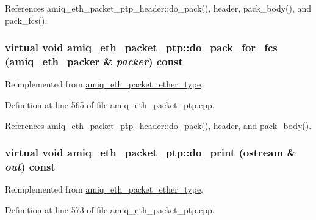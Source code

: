 References amiq\_\-eth\_\-packet\_\-ptp\_\-header::do\_\-pack(), header, pack\_\-body(), and pack\_\-fcs().\hypertarget{classamiq__eth__packet__ptp_a68337ad7c7971f267b692dfbd92ede7b}{
\subsubsection[{do\_\-pack\_\-for\_\-fcs}]{\setlength{\rightskip}{0pt plus 5cm}virtual void amiq\_\-eth\_\-packet\_\-ptp::do\_\-pack\_\-for\_\-fcs ({\bf amiq\_\-eth\_\-packer} \& {\em packer}) const}}
\label{classamiq__eth__packet__ptp_a68337ad7c7971f267b692dfbd92ede7b}


Reimplemented from \hyperlink{classamiq__eth__packet__ether__type_aaa85cf778650e1c1b377392a975cb7bc}{amiq\_\-eth\_\-packet\_\-ether\_\-type}.

Definition at line 565 of file amiq\_\-eth\_\-packet\_\-ptp.cpp.

References amiq\_\-eth\_\-packet\_\-ptp\_\-header::do\_\-pack(), header, and pack\_\-body().\hypertarget{classamiq__eth__packet__ptp_a52db9ab62ab743317a7ca4745a823a82}{
\subsubsection[{do\_\-print}]{\setlength{\rightskip}{0pt plus 5cm}virtual void amiq\_\-eth\_\-packet\_\-ptp::do\_\-print (ostream \& {\em out}) const}}
\label{classamiq__eth__packet__ptp_a52db9ab62ab743317a7ca4745a823a82}


Reimplemented from \hyperlink{classamiq__eth__packet__ether__type_a9b2852fa1aaf278138fde2232e446f63}{amiq\_\-eth\_\-packet\_\-ether\_\-type}.

Definition at line 573 of file amiq\_\-eth\_\-packet\_\-ptp.cpp.

